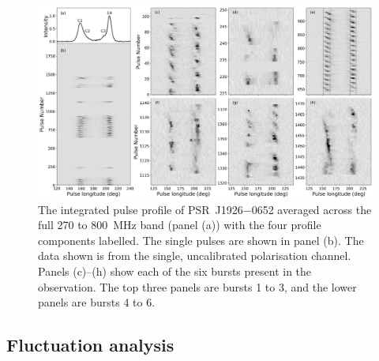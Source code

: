 \begin{landscape}
    \begin{figure}
        \begin{center}
            \includegraphics[height=0.8\textwidth]{Figures/J1926/stack.png}
            \caption[Pulse stacks of PSR~J1926$-$0652 as seen with FAST]{The integrated pulse profile of PSR~J1926$-$0652 averaged across the full 270 to 800~MHz band (panel (a)) with the four profile components labelled. The single pulses are shown in panel (b). The data shown is from the single, uncalibrated polarisation channel. Panels (c)--(h) show each of the six bursts present in the observation. The top three panels are bursts 1 to 3, and the lower panels are bursts 4 to 6.}
            \label{fig: J1926 - pulse stack}
        \end{center}
    \end{figure}
\end{landscape}


\subsection{Fluctuation analysis}
\label{sec: J1926 - analysis - single pulse variability}


